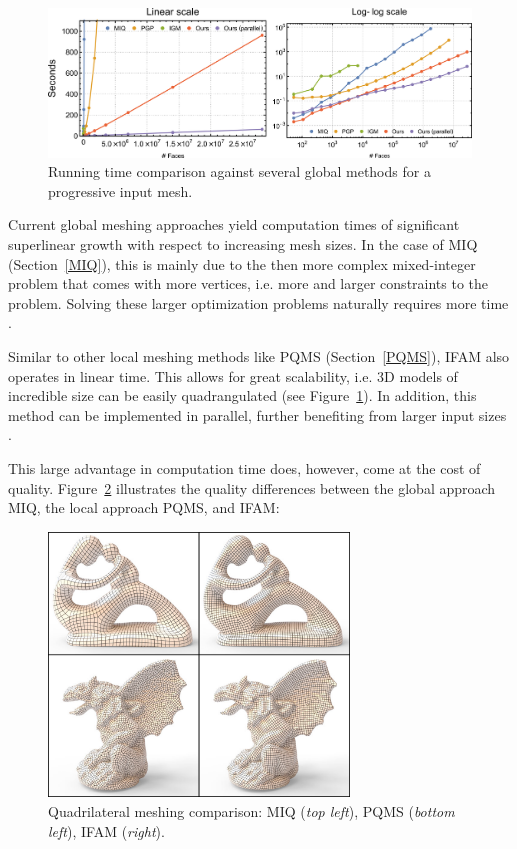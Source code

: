 \documentclass{ACGSeminar}
\begin{document}
\begin{figure}[htb!]
	\begin{centering}
		\includegraphics[width=12cm]{img/computation-time.png}\par
	\end{centering}
	\caption{Running time comparison against several global methods for a progressive input mesh. \cite{jakob2015instant}}
	\label{fig:computation-time}
\end{figure}

Current global meshing approaches yield computation times of significant superlinear growth with respect to increasing mesh sizes. In the case of MIQ (Section~\ref{MIQ}), this is mainly due to the then more complex mixed-integer problem that comes with more vertices, i.e. more and larger constraints to the problem. Solving these larger optimization problems naturally requires more time \cite{jakob2015instant,bommes2009mixed}.

Similar to other local meshing methods like PQMS (Section~\ref{PQMS}), IFAM also operates in linear time. This allows for great scalability, i.e. 3D models of incredible size can be easily quadrangulated (see Figure~\ref{fig:computation-time}). In addition, this method can be implemented in parallel, further benefiting from larger input sizes \cite{jakob2015instant}.\bigskip

This large advantage in computation time does, however, come at the cost of quality. Figure~\ref{fig:quality} illustrates the quality differences between the global approach MIQ, the local approach PQMS, and IFAM:

\begin{figure}[htb!]
	\begin{centering}
		\includegraphics[width=8cm]{img/quality.png}\par
	\end{centering}
	\caption{Quadrilateral meshing comparison: MIQ \cite{bommes2009mixed} (\textit{top left}), PQMS \cite{tarini2010practical} (\textit{bottom left}), IFAM (\textit{right}). \cite{jakob2015instant}}
	\label{fig:quality}
\end{figure}
\end{document}

